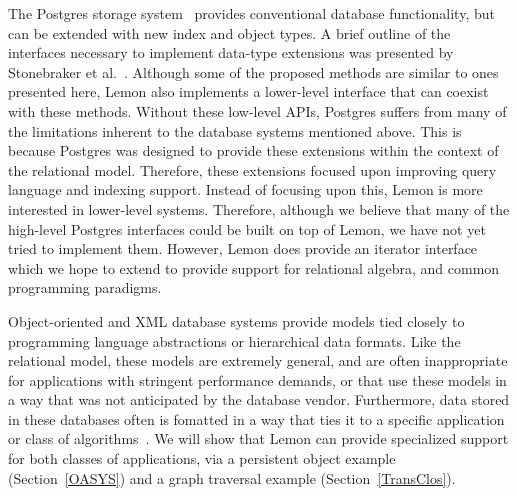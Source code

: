 \documentclass[letterpaper,twocolumn,english]{article}
\newcommand{\yad}{Lemon\xspace}
\begin{document}
The Postgres storage system~\cite{postgres} provides conventional
database functionality, but can be extended with new index and object
types.  A brief outline of the interfaces necessary to implement
data-type extensions was presented by Stonebraker et
al.~\cite{newTypes}.  Although some of the proposed methods are
similar to ones presented here, \yad also implements a lower-level
interface that can coexist with these methods.  Without these
low-level APIs, Postgres suffers from many of the limitations inherent
to the database systems mentioned above.  This is because Postgres was
designed to provide these extensions within the context of the
relational model.  Therefore, these extensions focused upon improving
query language and indexing support.  Instead of focusing upon this,
\yad is more interested in lower-level systems. Therefore, although we
believe that many of the high-level Postgres interfaces could be built
on top of \yad, we have not yet tried to implement them.
However, \yad does provide an iterator interface which we hope to
extend to provide support for relational algebra, and common
programming paradigms.

Object-oriented and XML database systems provide models tied closely
to programming language abstractions or hierarchical data formats.
Like the relational model, these models are extremely general, and are
often inappropriate for applications with stringent performance
demands, or that use these models in a way that was not anticipated by
the database vendor.  Furthermore, data stored in these databases
often is fomatted in a way that ties it to a specific application or
class of algorithms~\cite{lamb}.  We will show that \yad can provide 
specialized support for both classes of applications, via a persistent 
object example (Section~\ref{OASYS}) and a graph traversal example 
(Section~\ref{TransClos}).

\end{document}
